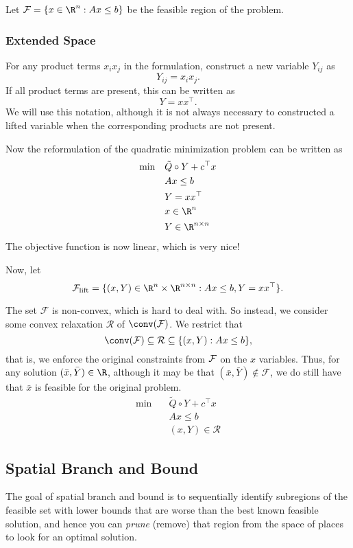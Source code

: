Let $\F = \{  x\in \R^n : Ax \leq b\}$ be the feasible region of the problem.

\subsubsection{Extended Space}

For any product terms $x_ix_j$ in the formulation, construct a new variable $Y_{ij}$ as
\begin{equation}
Y_{ij} = x_ix_j.
\end{equation}
If all product terms are present, this can be written as
\begin{equation}
Y = x x^\top.
\end{equation}
We will use this notation, although it is not always necessary to constructed a lifted variable when the corresponding products are not present.

Now the reformulation of the quadratic minimization problem can be written as 
\begin{align}
\label{lifted-problem}
\min\quad  &\tilde Q \circ Y + c^\top x\\
&Ax \leq b\\
& Y = x x^\top\\
&x \in \R^n\\
& Y \in \R^{n \times n}
\end{align}
The objective function is now linear, which is very nice!


Now, let
$$
\mathcal F_\lift = \{ (x,Y) \in \R^n \times \R^{n \times n}: Ax \leq b, Y = x x^\top\}.
$$

The set $\mathcal F$ is non-convex, which is hard to deal with.  So instead, we consider some convex relaxation $\mathcal R$ of $\conv(\mathcal F)$.  We restrict that 
$$
\conv(\mathcal F) \subseteq \mathcal R \subseteq \{ (x,Y) : Ax \leq b \},
$$
that is, we enforce the original constraints from ${\mathcal F}$ on the $x$ variables.  Thus, for any solution $(\bar x,\bar Y) \in \R$, although it may be that $(\bar x, \bar Y) \notin \mathcal F$, we do still have that $\bar x$ is feasible for the original problem.
\begin{align}
\label{relaxed-lifted-problem}
\min\quad  &\tilde Q \circ Y + c^\top x\\
&Ax \leq b\\
& (x,Y) \in \mathcal R
\end{align}

\subsection{Spatial Branch and Bound}
The goal of spatial branch and bound is to sequentially identify subregions of the feasible set with lower bounds that are worse than the best known feasible solution, and hence you can \emph{prune} (remove) that region from the space of 
places to look for an optimal solution.


